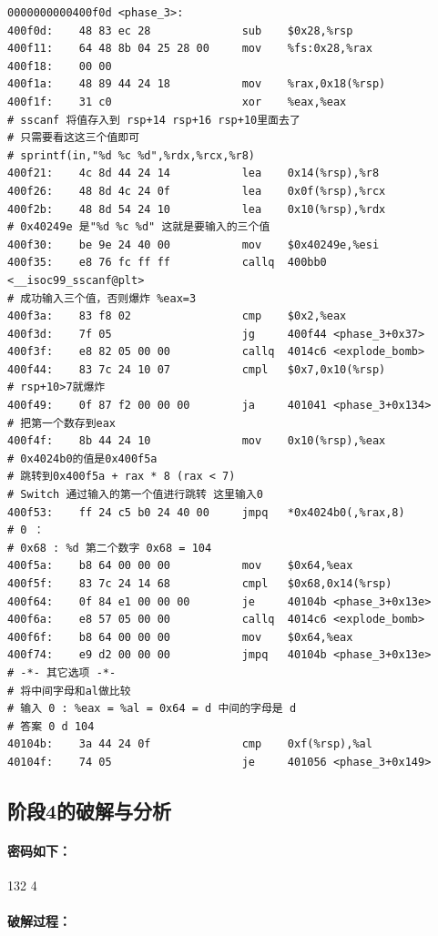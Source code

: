 \begin{verbatim}
0000000000400f0d <phase_3>:
400f0d:    48 83 ec 28              sub    $0x28,%rsp
400f11:    64 48 8b 04 25 28 00     mov    %fs:0x28,%rax
400f18:    00 00 
400f1a:    48 89 44 24 18           mov    %rax,0x18(%rsp)
400f1f:    31 c0                    xor    %eax,%eax
# sscanf 将值存入到 rsp+14 rsp+16 rsp+10里面去了
# 只需要看这这三个值即可
# sprintf(in,"%d %c %d",%rdx,%rcx,%r8)
400f21:    4c 8d 44 24 14           lea    0x14(%rsp),%r8
400f26:    48 8d 4c 24 0f           lea    0x0f(%rsp),%rcx
400f2b:    48 8d 54 24 10           lea    0x10(%rsp),%rdx
# 0x40249e 是"%d %c %d" 这就是要输入的三个值
400f30:    be 9e 24 40 00           mov    $0x40249e,%esi
400f35:    e8 76 fc ff ff           callq  400bb0 <__isoc99_sscanf@plt>
# 成功输入三个值，否则爆炸 %eax=3
400f3a:    83 f8 02                 cmp    $0x2,%eax
400f3d:    7f 05                    jg     400f44 <phase_3+0x37>
400f3f:    e8 82 05 00 00           callq  4014c6 <explode_bomb>
400f44:    83 7c 24 10 07           cmpl   $0x7,0x10(%rsp)
# rsp+10>7就爆炸
400f49:    0f 87 f2 00 00 00        ja     401041 <phase_3+0x134>
# 把第一个数存到eax
400f4f:    8b 44 24 10              mov    0x10(%rsp),%eax
# 0x4024b0的值是0x400f5a 
# 跳转到0x400f5a + rax * 8 (rax < 7)
# Switch 通过输入的第一个值进行跳转 这里输入0
400f53:    ff 24 c5 b0 24 40 00     jmpq   *0x4024b0(,%rax,8)
# 0 ：
# 0x68 : %d 第二个数字 0x68 = 104
400f5a:    b8 64 00 00 00           mov    $0x64,%eax
400f5f:    83 7c 24 14 68           cmpl   $0x68,0x14(%rsp)
400f64:    0f 84 e1 00 00 00        je     40104b <phase_3+0x13e>
400f6a:    e8 57 05 00 00           callq  4014c6 <explode_bomb>
400f6f:    b8 64 00 00 00           mov    $0x64,%eax
400f74:    e9 d2 00 00 00           jmpq   40104b <phase_3+0x13e>
# -*- 其它选项 -*-
# 将中间字母和al做比较
# 输入 0 : %eax = %al = 0x64 = d 中间的字母是 d
# 答案 0 d 104
40104b:    3a 44 24 0f              cmp    0xf(%rsp),%al
40104f:    74 05                    je     401056 <phase_3+0x149>
\end{verbatim}

\subsection{阶段4的破解与分析}

\paragraph{密码如下：}132 4

\paragraph{破解过程：}


